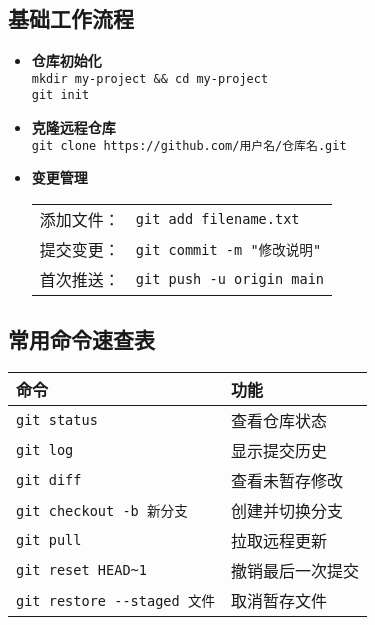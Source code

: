 \subsection{基础工作流程}
\begin{itemize}[leftmargin=*, nosep]
    \item \textbf{仓库初始化} \\
    \texttt{mkdir my-project \&\& cd my-project} \\
    \texttt{git init}
    
    \item \textbf{克隆远程仓库} \\
    \texttt{git clone https://github.com/用户名/仓库名.git}
    
    \item \textbf{变更管理} \\
    \begin{tabular}{@{}ll@{}}
        添加文件： & \texttt{git add filename.txt} \\
        提交变更： & \texttt{git commit -m "修改说明"} \\
        首次推送： & \texttt{git push -u origin main}
    \end{tabular}
\end{itemize}

\subsection{常用命令速查表}
\begin{center}
\begin{tabular}{ll}
    \toprule
    \textbf{命令} & \textbf{功能} \\
    \midrule
    \texttt{git status} & 查看仓库状态 \\
    \texttt{git log} & 显示提交历史 \\
    \texttt{git diff} & 查看未暂存修改 \\
    \texttt{git checkout -b 新分支} & 创建并切换分支 \\
    \texttt{git pull} & 拉取远程更新 \\
    \texttt{git reset HEAD\~{}1} & 撤销最后一次提交 \\
    \texttt{git restore {-}{-}staged 文件} & 取消暂存文件 \\
    \bottomrule
\end{tabular}
\end{center}

